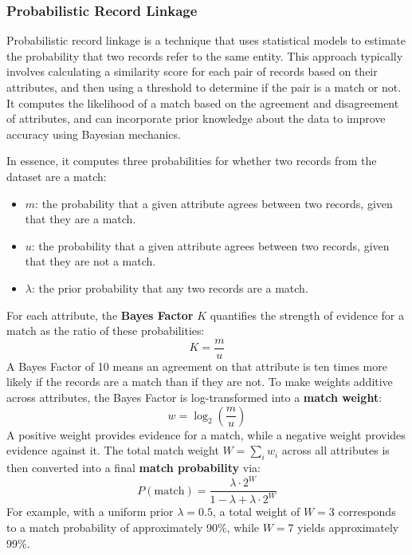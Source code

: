 \subsubsection{Probabilistic Record Linkage}\label{subsubsec:probabilistic_record_linkage}

Probabilistic record linkage is a technique that uses statistical models to estimate the probability that two records refer to the same entity.
This approach typically involves calculating a similarity score for each pair of records based on their attributes, and then using a threshold to determine if the pair is a match or not.
It computes the likelihood of a match based on the agreement and disagreement of attributes, and can incorporate prior knowledge about the data to improve accuracy using Bayesian mechanics.\cite{ProspeoProbabilisticMatching}

In essence, it computes three probabilities for whether two records from the dataset are a match:
\begin{itemize}
    \item $m$: the probability that a given attribute agrees between two records, given that they are a match.
    \item $u$: the probability that a given attribute agrees between two records, given that they are not a match.
    \item $\lambda$: the prior probability that any two records are a match.
\end{itemize}

For each attribute, the \textbf{Bayes Factor} $K$ quantifies the strength of evidence for a match as the ratio of these probabilities:
\begin{equation}
    K = \frac{m}{u}\label{eq:equation}
\end{equation}
A Bayes Factor of 10 means an agreement on that attribute is ten times more likely if the records are a match than if they are not.
To make weights additive across attributes, the Bayes Factor is log-transformed into a \textbf{match weight}:
\begin{equation}
    w = \log_2\!\left(\frac{m}{u}\right)\label{eq:equation2}
\end{equation}
A positive weight provides evidence for a match, while a negative weight provides evidence against it.
The total match weight $W = \sum_i w_i$ across all attributes is then converted into a final \textbf{match probability} via:
\begin{equation}
    P(\text{match}) = \frac{\lambda \cdot 2^W}{1 - \lambda + \lambda \cdot 2^W}\label{eq:equation3}
\end{equation}
For example, with a uniform prior $\lambda = 0.5$, a total weight of $W = 3$ corresponds to a match probability of approximately 90\%, while $W = 7$ yields approximately 99\%.\cite{winkler1991application}

